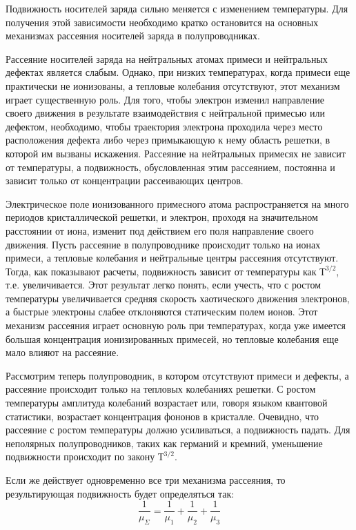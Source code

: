 Подвижность носителей заряда сильно меняется с изменением температуры. Для получения этой зависимости необходимо кратко
остановится на основных механизмах рассеяния носителей заряда в полупроводниках. 

Рассеяние носителей заряда на нейтральных атомах примеси и нейтральных дефектах является слабым. Однако, при низких
температурах, когда примеси еще практически не ионизованы, а тепловые колебания отсутствуют, этот механизм играет
существенную роль. Для того, чтобы электрон изменил направление своего движения в результате взаимодействия с
нейтральной примесью или дефектом, необходимо, чтобы траектория электрона проходила через место расположения дефекта
либо через примыкающую к нему область решетки, в которой им вызваны искажения. Рассеяние на нейтральных примесях не
зависит от температуры, а подвижность, обусловленная этим рассеянием, постоянна и зависит только от концентрации
рассеивающих центров.

Электрическое поле ионизованного примесного атома распространяется на много периодов кристаллической решетки, и
электрон, проходя на значительном расстоянии от иона, изменит под действием его поля направление своего движения. Пусть
рассеяние в полупроводнике происходит только на ионах примеси, а тепловые колебания и нейтральные центры рассеяния
отсутствуют. Тогда, как показывают расчеты, подвижность зависит от температуры как $Т^{3/2}$, т.е. увеличивается. Этот
результат легко понять, если учесть, что с ростом температуры увеличивается средняя скорость хаотического движения
электронов, а быстрые электроны слабее отклоняются статическим полем ионов. Этот механизм рассеяния играет основную роль
при температурах, когда уже имеется большая концентрация ионизированных примесей, но тепловые колебания еще мало влияют
на рассеяние. 

Рассмотрим теперь полупроводник, в котором отсутствуют примеси и дефекты, а рассеяние происходит только на тепловых
колебаниях решетки. С ростом температуры амплитуда колебаний возрастает или, говоря языком квантовой статистики,
возрастает концентрация фононов в кристалле. Очевидно, что рассеяние с ростом температуры должно усиливаться, а
подвижность падать. Для неполярных полупроводников, таких как германий и кремний, уменьшение подвижности происходит по
закону $Т^{3/2}$. 

Если же действует одновременно все три механизма рассеяния, то результирующая подвижность будет определяться так: 
\begin{equation}
	\frac{1}{\mu_{\Sigma}} = \frac{1}{\mu_{1}}+\frac{1}{\mu_{2}}+\frac{1}{\mu_{3}}
	\label{eq:3.1}
\end{equation}

